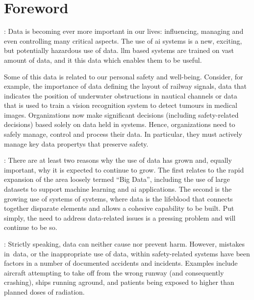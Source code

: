 \makeatletter		%
\dsiwg@intblankpage
\makeatother

\pagestyle{FirstPageFrontMatter}
\section*{Foreword}


:
Data is becoming ever more important in our lives: influencing, managing and even controlling many critical aspects.
\cbstart The use of \gls{ai} systems is a new, exciting, but potentially hazardous use of data. \gls{llm} based systems are trained on vast amount of data, and it this data which enables them to be useful.

Some of this data is related to our personal safety and well-being.
Consider, for example, the importance of data defining the layout of railway signals,
data that indicates the position of underwater obstructions in nautical channels or data that
is used to train a vision recognition system to detect tumours in medical images.
Organizations now make significant decisions (including safety-related decisions) based solely on data held in systems.
Hence, organizations need to safely manage, control and process their data.
In particular, they must actively manage key \glspl{data property} that preserve safety.\cbend\

: There are at least two reasons why the use of data has grown and, equally important, why it is expected to continue to grow. The  first relates to the rapid expansion of the area loosely termed ``Big Data'', including the use of large \glspl{dataset} to support machine learning and \gls{ai} applications. The second is the growing use of systems of systems, where data is the lifeblood that connects together disparate elements and allows a cohesive capability to be built. Put simply, the need to address data-related issues is a pressing problem and will continue to be so.

: Strictly speaking,
data can neither cause nor prevent harm.
However, \cbstart mistakes in\cbend\ data, or the inappropriate use of data, within safety-related systems have been factors in a number of documented accidents and incidents. Examples include aircraft attempting to take off from the wrong runway (and consequently crashing), ships running aground, and patients being exposed to higher than planned doses of radiation.

